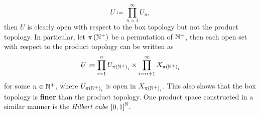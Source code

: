 \documentclass[math]{amznotes}
\theoremstyle{remark}
\begin{document}
\begin{equation*}
    U \coloneqq \prod_{n = 1}^{\infty}U_n,
\end{equation*}
then $U$ is clearly open with respect to the box topology but not the product topology. In particular, let $\pi\left(\mathbb{N}^+\right)$ be a permutation of $\mathbb{N}^+$, then each open set with respect to the product topology can be written as 
\begin{equation*}
    U \coloneqq \prod_{i = 1}^{n}U_{\pi\left(\mathbb{N}^+\right)_i} \times \prod_{i = n + 1}^{\infty}X_{\pi\left(\mathbb{N}^+\right)_i}
\end{equation*}
for some $n \in \mathbb{N}^+$, where $U_{\pi\left(\mathbb{N}^+\right)_i}$ is open in $X_{\pi\left(\mathbb{N}^+\right)_i}$. This also shows that the box topology is \textbf{finer} than the product topology. One product space constructed in a similar manner is the \textit{Hilbert cube} $\left[0, 1\right]^{\mathbb{N}}$.
\end{document}
